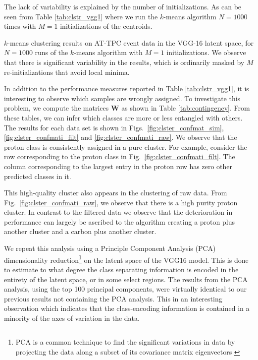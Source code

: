 \documentclass[preprint,12pt]{elsarticle}
\begin{document}
\noindent The lack of variability is explained by the number of initializations. As can be seen from Table \ref{tab:clstr_vgg1} where we run the $k$-means algorithm $N=1000$ times with $M=1$ initializations of the centroids. 

\begin{table}[H]
\centering 
\caption[$k$-means on pre-trained model]{$k$-means clustering results on AT-TPC event data in the VGG-16 latent space, for $N=1000$ runs of the $k$-means algorithm with $M=1$ initializations. We observe that there is significant variability in the results, which is ordinarily masked by $M$ re-initializations that avoid local minima. }\label{tab:clstr_vgg1}

\end{table}


In addition to the performance measures reported in Table \ref{tab:clstr_vgg1}, it is interesting to observe which samples are wrongly assigned. To investigate this problem, we compute the matrices $\mathbf{W}$ as shown in Table \ref{tab:contingency}. From these tables, we can infer which classes are more or less entangled with others. The results for each data set is shown in  Figs.~\ref{fig:clster_confmat_sim}, \ref{fig:clster_confmati_filt} and \ref{fig:clster_confmati_raw}. We observe that the proton class is consistently assigned in a pure cluster. For example, consider the row corresponding to the proton class in Fig.~\ref{fig:clster_confmati_filt}. The column corresponding to the largest entry in the proton row has zero other predicted classes in it.

This high-quality cluster also appears in the clustering of raw data. From Fig.~\ref{fig:clster_confmati_raw}, we observe that there is a high purity proton cluster. In contrast to the filtered data we observe that the deterioration in performance can largely be ascribed to the algorithm creating a proton plus another cluster and a carbon plus another cluster.



We repeat this analysis using a Principle Component Analysis (PCA) dimensionality reduction\footnote{
PCA is a common technique to find the significant variations in data by projecting the data along a subset of its covariance matrix eigenvectors \cite{vidal2016,Marsland2009}
} on the latent space of the VGG16 model. This is done to estimate to what degree the class separating information is encoded in the entirety of the latent space, or in some select regions. The results from the PCA analysis, using the top 100 principal components, were virtually identical to our previous results not containing  the PCA analysis. This in an interesting observation which indicates that the class-encoding information is contained in a minority of the axes of variation in the data.
\end{document}
